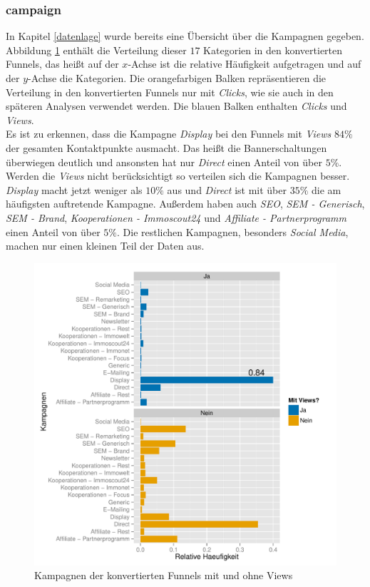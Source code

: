 \subsubsection*{campaign}
In Kapitel \ref{datenlage} wurde bereits eine Übersicht über die Kampagnen gegeben. Abbildung \ref{campaignSucc} enthält die Verteilung dieser $17$ Kategorien in den konvertierten Funnels, das heißt auf der $x$-Achse ist die relative Häufigkeit aufgetragen und auf der $y$-Achse die Kategorien. Die orangefarbigen Balken repräsentieren die Verteilung in den konvertierten Funnels nur mit \textit{Clicks}, wie sie auch in den späteren Analysen verwendet werden. Die blauen Balken enthalten \textit{Clicks} und \textit{Views}.\\
Es ist zu erkennen, dass die Kampagne \textit{Display} bei den Funnels mit \textit{Views} $84 \%$ der gesamten Kontaktpunkte ausmacht. Das heißt die Bannerschaltungen überwiegen deutlich und ansonsten hat nur \textit{Direct} einen Anteil von über $5 \%$.\\
Werden die \textit{Views} nicht berücksichtigt so verteilen sich die Kampagnen besser. \textit{Display} macht jetzt weniger als $10 \%$ aus und \textit{Direct} ist mit über $35 \%$ die am häufigsten auftretende Kampagne. Außerdem haben auch \textit{SEO}, \textit{SEM - Generisch}, \textit{SEM - Brand}, \textit{Kooperationen - Immoscout24} und \textit{Affiliate - Partnerprogramm} einen Anteil von über $5 \%$. Die restlichen Kampagnen, besonders \textit{Social Media}, machen nur einen kleinen Teil der Daten aus.
\begin{figure}[H]
    \centering
    \includegraphics[scale=0.6]{campaignSucc.pdf}
    \caption[Kampagnen der konvertierten Funnels]{Kampagnen der konvertierten Funnels mit und ohne Views}
    \label{campaignSucc}
\end{figure}

